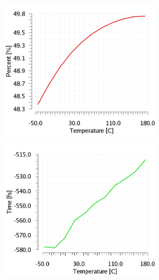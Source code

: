 \begin{figure}[htp]
    \centering
    \begin{subfigure}[b]{0.32\textwidth}
        \includegraphics[width=0.9\textwidth]{Chapter5/Figs/lvds/DutyCycle-Vcm1V.png}
    \end{subfigure}
    \begin{subfigure}[b]{0.32\textwidth}
        \includegraphics[width=0.9\textwidth]{Chapter5/Figs/lvds/PeriodJitter-Vcm1V.png}
    \end{subfigure}
    \begin{subfigure}[b]{0.32\textwidth}

\end{subfigure}
\end{figure}
